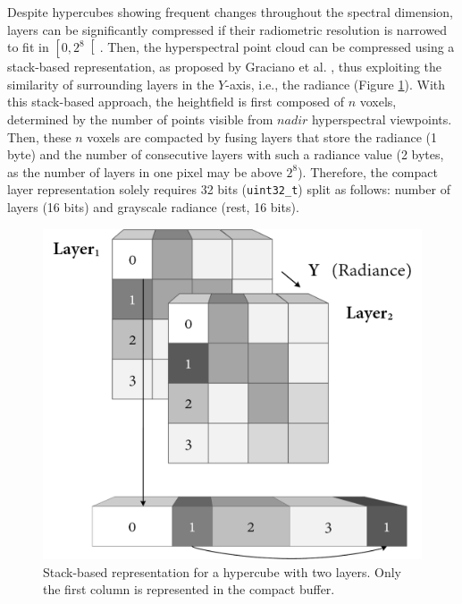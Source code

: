 Despite hypercubes showing frequent changes throughout the spectral dimension, layers can be significantly compressed if their radiometric resolution is narrowed to fit in $\left[0, 2^8\right[$. Then, the hyperspectral point cloud can be compressed using a stack-based representation, as proposed by Graciano et al. \cite{graciano_quadstack_2021}, thus exploiting the similarity of surrounding layers in the $Y$-axis, i.e., the radiance (Figure \ref{fig:hyper_compression_stack}). With this stack-based approach, the heightfield is first composed of $n$ voxels, determined by the number of points visible from $\textit{nadir}$ hyperspectral viewpoints. Then, these $n$ voxels are compacted by fusing layers that store the radiance (1 byte) and the number of consecutive layers with such a radiance value (2 bytes, as the number of layers in one pixel may be above $2^8$). Therefore, the compact layer representation solely requires 32 bits (\verb|uint32_t|) split as follows: number of layers (16 bits) and grayscale radiance (rest, 16 bits).

\begin{figure}[ht]
    \centering
    \includegraphics[width=.65\linewidth]{figs/hyper_point_cloud/stack.png}
	\caption{Stack-based representation for a hypercube with two layers. Only the first column is represented in the compact buffer. }
	\label{fig:hyper_compression_stack}
\end{figure}

